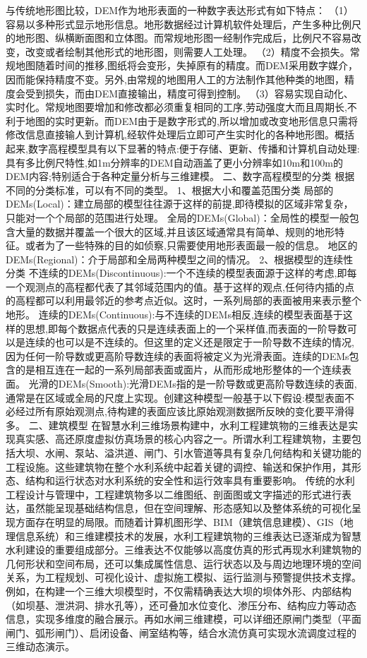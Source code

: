 与传统地形图比较，DEM作为地形表面的一种数字表达形式有如下特点： （1）容易以多种形式显示地形信息。地形数据经过计算机软件处理后，产生多种比例尺的地形图、纵横断面图和立体图。而常规地形图一经制作完成后，比例尺不容易改变，改变或者绘制其他形式的地形图，则需要人工处理。 （2）精度不会损失。常规地图随着时间的推移,图纸将会变形，失掉原有的精度。而DEM采用数字媒介，因而能保持精度不变。另外,由常规的地图用人工的方法制作其他种类的地图，精度会受到损失，而由DEM直接输出，精度可得到控制。 （3）容易实现自动化、实时化。常规地图要增加和修改都必须重复相同的工序,劳动强度大而且周期长,不利于地图的实时更新。而DEM由于是数字形式的,所以增加或改变地形信息只需将修改信息直接输人到计算机,经软件处理后立即可产生实时化的各种地形图。概括起来,数字高程模型具有以下显著的特点:便于存储、更新、传播和计算机自动处理:具有多比例尺特性,如1m分辨率的DEM自动涵盖了更小分辨率如10m和100m的DEM内容;特别适合于各种定量分析与三维建模。 二、数字高程模型的分类 根据不同的分类标准，可以有不同的类型。 1、根据大小和覆盖范围分类 局部的DEMs(Local)：建立局部的模型往往源于这样的前提,即待模拟的区域非常复杂，只能对一个个局部的范围进行处理。 全局的DEMs(Global)：全局性的模型一般包含大量的数据并覆盖一个很大的区域,并且该区域通常具有简单、规则的地形特征。或者为了一些特殊的目的如侦察,只需要使用地形表面最一般的信息。 地区的DEMs(Regional)：介于局部和全局两种模型之间的情况。 2、根据模型的连续性分类 不连续的DEMs(Discontinuous):一个不连续的模型表面源于这样的考虑,即每一个观测点的高程都代表了其邻域范围内的值。基于这样的观点,任何待内插的点的高程都可以利用最邻近的参考点近似。这时，一系列局部的表面被用来表示整个地形。 连续的DEMs(Continuous):与不连续的DEMs相反,连续的模型表面基于这样的思想,即每个数据点代表的只是连续表面上的一个采样值,而表面的一阶导数可以是连续的也可以是不连续的。但这里的定义还是限定于一阶导数不连续的情况,因为任何一阶导数或更高阶导数连续的表面将被定义为光滑表面。连续的DEMs包含的是相互连在一起的一系列局部表面或面片，从而形成地形整体的一个连续表面。 光滑的DEMs(Smooth):光滑DEMs指的是一阶导数或更高阶导数连续的表面,通常是在区域或全局的尺度上实现。创建这种模型一般基于以下假设:模型表面不必经过所有原始观测点,待构建的表面应该比原始观测数据所反映的变化要平滑得多。 二、建筑模型 在智慧水利三维场景构建中，水利工程建筑物的三维表达是实现真实感、高还原度虚拟仿真场景的核心内容之一。所谓水利工程建筑物，主要包括大坝、水闸、泵站、溢洪道、闸门、引水管道等具有复杂几何结构和关键功能的工程设施。这些建筑物在整个水利系统中起着关键的调控、输送和保护作用，其形态、结构和运行状态对水利系统的安全性和运行效率具有重要影响。 传统的水利工程设计与管理中，工程建筑物多以二维图纸、剖面图或文字描述的形式进行表达，虽然能呈现基础结构信息，但在空间理解、形态感知以及整体系统的可视化呈现方面存在明显的局限。而随着计算机图形学、BIM（建筑信息建模）、GIS（地理信息系统）和三维建模技术的发展，水利工程建筑物的三维表达已逐渐成为智慧水利建设的重要组成部分。三维表达不仅能够以高度仿真的形式再现水利建筑物的几何形状和空间布局，还可以集成属性信息、运行状态以及与周边地理环境的空间关系，为工程规划、可视化设计、虚拟施工模拟、运行监测与预警提供技术支撑。例如，在构建一个三维大坝模型时，不仅需精确表达大坝的坝体外形、内部结构（如坝基、泄洪洞、排水孔等），还可叠加水位变化、渗压分布、结构应力等动态信息，实现多维度的融合展示。再如水闸三维建模，可以详细还原闸门类型（平面闸门、弧形闸门）、启闭设备、闸室结构等，结合水流仿真可实现水流调度过程的三维动态演示。 